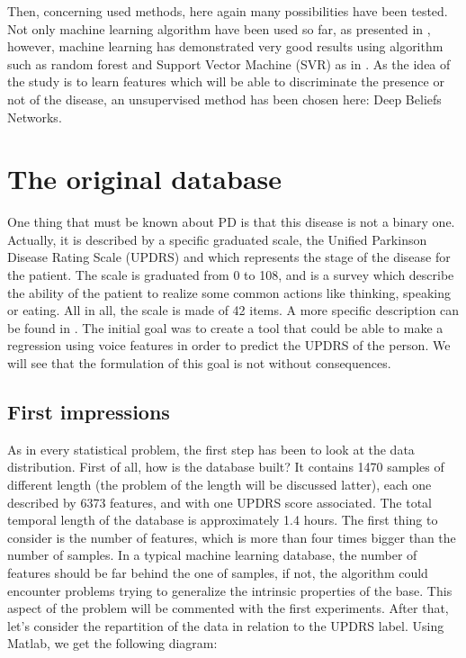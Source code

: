 \documentclass{report}
\begin{document}
	Then, concerning used methods, here again many possibilities have been tested. Not only machine learning algorithm have been used so far, as presented in \cite{little2006nonlinear}, however, machine learning has demonstrated very good results using algorithm such as random forest and Support Vector Machine (SVR) as in \cite{tsanas2012novel}. As the idea of the study is to learn features which will be able to discriminate the presence or not of the disease, an unsupervised method has been chosen here: Deep Beliefs Networks.
	
	\chapter{The original database}
	
	One thing that must be known about PD is that this disease is not a binary one. Actually, it is described by a specific graduated scale, the Unified Parkinson Disease Rating Scale (UPDRS) and which represents the stage of the disease for the patient. The scale is graduated from 0 to 108, and is a survey which describe the ability of the patient to realize some common actions like thinking, speaking or eating. All in all, the scale is made of 42 items. A more specific description can be found in \cite{movement2003unified}. The initial goal was to create a tool that could be able to make a regression using voice features in order to predict the UPDRS of the person. We will see that the formulation of this goal is not without consequences.
	
	\section{First impressions}
	
	As in every statistical problem, the first step has been to look at the data distribution. First of all, how is the database built? It contains 1470 samples of different length (the problem of the length will be discussed latter), each one described by 6373 features, and with one UPDRS score associated. The total temporal length of the database is approximately 1.4 hours. The first thing to consider is the number of features, which is more than four times bigger than the number of samples. In a typical machine learning database, the number of features should be far behind the one of samples, if not, the algorithm could encounter problems trying to generalize the intrinsic properties of the base. This aspect of the problem will be commented with the first experiments.
	After that, let's consider the repartition of the data in relation to the UPDRS label. Using Matlab, we get the following diagram:
	
\end{document}
